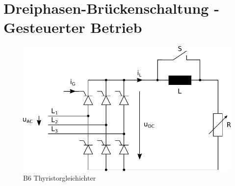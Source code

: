 \section{Dreiphasen-Brückenschaltung - Gesteuerter Betrieb}

\begin{figure}[h!]
    \centering
    \includegraphics[scale=1]{./../fig/b6_thyristor.pdf}
    \caption{B6 Thyristorgleichichter}
    \label{fig:b6_thyristor}
\end{figure}
